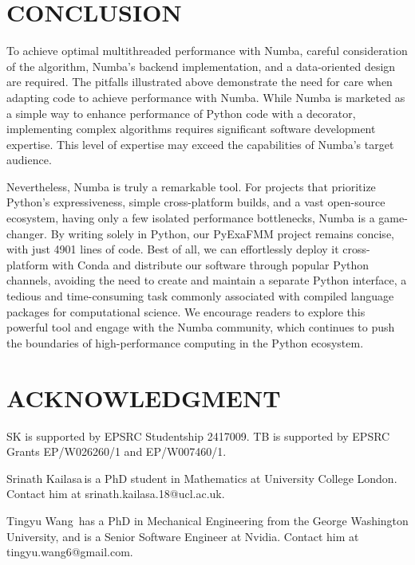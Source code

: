\documentclass{IEEEcsmag}
\begin{document}
\section{CONCLUSION}

To achieve optimal multithreaded performance with Numba, careful consideration of the algorithm, Numba's backend implementation, and a data-oriented design are required. The pitfalls illustrated above demonstrate the need for care when adapting code to achieve performance with Numba. While Numba is marketed as a simple way to enhance performance of Python code with a decorator, implementing complex algorithms requires significant software development expertise. This level of expertise may exceed the capabilities of Numba's target audience.

Nevertheless, Numba is truly a remarkable tool. For projects that prioritize Python's expressiveness, simple cross-platform builds, and a vast open-source ecosystem, having only a few isolated performance bottlenecks, Numba is a game-changer. By writing solely in Python, our PyExaFMM project remains concise, with just 4901 lines of code. Best of all, we can effortlessly deploy it cross-platform with Conda and distribute our software through popular Python channels, avoiding the need to create and maintain a separate Python interface, a tedious and time-consuming task commonly associated with compiled language packages for computational science.
We encourage readers to explore this powerful tool and engage with the Numba community, which continues to push the boundaries of high-performance computing in the Python ecosystem.

\section{ACKNOWLEDGMENT}

SK is supported by EPSRC Studentship 2417009. TB is supported by EPSRC Grants EP/W026260/1 and EP/W007460/1.





\begin{IEEEbiography}{Srinath Kailasa}{\,}is a PhD student in Mathematics at University College London. Contact him at srinath.kailasa.18@ucl.ac.uk.
\end{IEEEbiography}

\begin{IEEEbiography}{Tingyu Wang}{\,} has a PhD in Mechanical Engineering from the George Washington University, and is a Senior Software Engineer at Nvidia. Contact him at tingyu.wang6@gmail.com.
\end{IEEEbiography}
\end{document}
